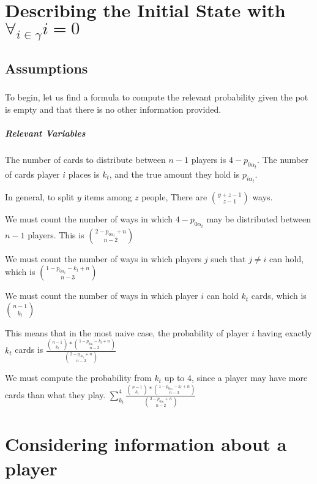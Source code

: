 \documentclass[letterpaper,11pt]{report}
\begin{document}
\chapter{Describing the Initial State with $\forall_{i\in\gamma} i = 0$}
\section{Assumptions} 
\paragraph*{} To begin, let us find a formula to compute the relevant probability given the pot is empty and that there is no other information provided.
\paragraph*{Relevant Variables} The number of cards to distribute between $n-1$ players is $4-p_{0 \alpha_{t}}$. The number of cards player $i$ places is $k_t$, and the true amount they hold is $p_{i \alpha_t}$.
\begin{description}
    \item In general, to split $y$ items among $z$ people, There are ${y+z-1 \choose z-1}$ ways.
    \item We must count the number of ways in which $4-p_{0 \alpha_{t}}$ may be distributed between $n-1$ players. This is ${2-p_{0 \alpha_{t}} + n \choose n-2}$
    \item We must count the number of ways in which players $j$ such that $j\neq i$ can hold, which is ${1-p_{0 \alpha_{t}} - k_t + n \choose n-3}$ 
    \item We must count the number of ways in which player $i$ can hold $k_t$ cards, which is ${n-1 \choose k_t}$
    \linebreak
    \item This means that in the most naive case, the probability of player $i$ having exactly $k_t$ cards is  $\frac{{n-1 \choose k_t}\ast{1-p_{0 \alpha_{t}} - k_t + n \choose n-3}}{{2-p_{0 \alpha_{t}} + n \choose n-2}}$
    \item We must compute the probability from $k_t$ up to $4$, since a player may have more cards than what they play. $\sum\limits_{k_t}^{4} \frac{{n-1 \choose k_t}\ast{1-p_{0 \alpha_{t}} - k_t + n \choose n-3}}{{2-p_{0 \alpha_{t}} + n \choose n-2}}$ 
\end{description}
\chapter{Considering information about a player}
\end{document}
